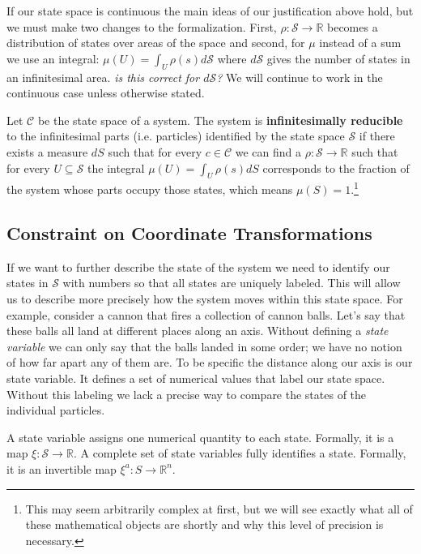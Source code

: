 \documentclass{article}
\begin{document}
	If our state space is continuous the main ideas of our justification above hold, but we must make two changes to the formalization. First, $\rho : \mathcal{S} \to \mathbb{R}$ becomes a distribution of states over areas of the space and second, for $\mu$ instead of a sum we use an integral: $\mu(U) = \int_{U} \rho(s) d\mathcal{S}$ where $d\mathcal{S}$ gives the number of states in an infinitesimal area. \emph{is this correct for $d\mathcal{S}$?} We will continue to work in the continuous case unless otherwise stated.
	
\begin{defn}
	Let $\mathcal{C}$ be the state space of a system. The system is \textbf{infinitesimally reducible} to the infinitesimal parts (i.e. particles) identified by the state space $\mathcal{S}$ if there exists a measure $dS$ such that for every $c \in \mathcal{C}$ we can find a $\rho : \mathcal{S} \to \mathbb{R}$ such that for every $U \subseteq \mathcal{S}$ the integral $\mu(U) = \int_U \rho(s) dS$ corresponds to the fraction of the system whose parts occupy those states, which means $\mu(S) = 1$.\footnote{This may seem arbitrarily complex at first, but we will see exactly what all of these mathematical objects are shortly and why this level of precision is necessary.}
\end{defn}	
	
\subsection{Constraint on Coordinate Transformations}	

	If we want to further describe the state of the system we need to identify our states in $\mathcal{S}$ with numbers so that all states are uniquely labeled. This will allow us to describe more precisely how the system moves within this state space. For example, consider a cannon that fires a collection of cannon balls. Let's say that these balls all land at different places along an axis. Without defining a \textit{state variable} we can only say that the balls landed in some order; we have no notion of how far apart any of them are. To be specific the distance along our axis is our state variable. It defines a set of numerical values that label our state space. Without this labeling we lack a precise way to compare the states of the individual particles.

\begin{defn}
	A state variable assigns one numerical quantity to each state. Formally, it is a map $\xi : \mathcal{S} \to \mathbb{R}$. A complete set of state variables fully identifies a state. Formally, it is an invertible  map $\xi^a : S \rightarrow \mathbb{R}^n $.
\end{defn}
\end{document}
